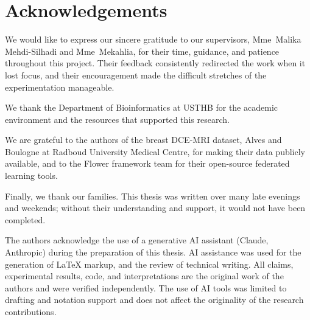 \chapter*{Acknowledgements}

We would like to express our sincere gratitude to our
supervisors, Mme~Malika Mehdi-Silhadi and Mme~Mekahlia,
for their time, guidance, and patience throughout this
project.
Their feedback consistently redirected the work when it
lost focus, and their encouragement made the difficult
stretches of the experimentation manageable.

We thank the Department of Bioinformatics at USTHB for
the academic environment and the resources that supported
this research.

We are grateful to the authors of the breast DCE-MRI
dataset, Alves and Boulogne at Radboud University
Medical Centre, for making their data publicly
available, and to the Flower framework team for their
open-source federated learning tools.

Finally, we thank our families.
This thesis was written over many late evenings and
weekends; without their understanding and support,
it would not have been completed.

The authors acknowledge the use of a generative AI
assistant (Claude, Anthropic) during the preparation of
this thesis. AI assistance was used for the generation of
LaTeX markup, and the review of technical writing.
All claims, experimental results, code, and interpretations
are the original work of the authors and were verified
independently. The use of AI tools was limited to
drafting and notation support and does not affect the
originality of the research contributions.
